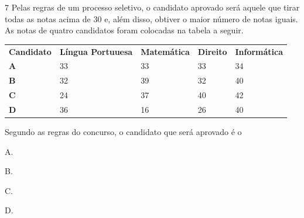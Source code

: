 

\num{7}  Pelas regras de um processo seletivo, o candidato aprovado
será aquele que tirar todas as notas acima de $30$ e, além disso, obtiver o
maior número de notas iguais. As notas de quatro candidatos foram colocadas
na tabela a seguir.

\begin{table}[H]\centering
\begin{tabular}{lllll}
\textbf{Candidato} & \textbf{Língua Portuuesa} & \textbf{Matemática} & \textbf{Direito} & \textbf{Informática} \\
\textbf{A}         & 33                        & 33                  & 33               & 34                   \\
\textbf{B}         & 32                        & 39                  & 32               & 40                   \\
\textbf{C}         & 24                        & 37                  & 40               & 42                   \\
\textbf{D}         & 36                        & 16                  & 26               & 40                  
\end{tabular}
\end{table}

Segundo as regras do concurso, o candidato que será aprovado é o

\begin{multicols}{2}
\begin{escolha}
\item A.
\item B.
\item C.
\item D.
\end{escolha}
\end{multicols}

